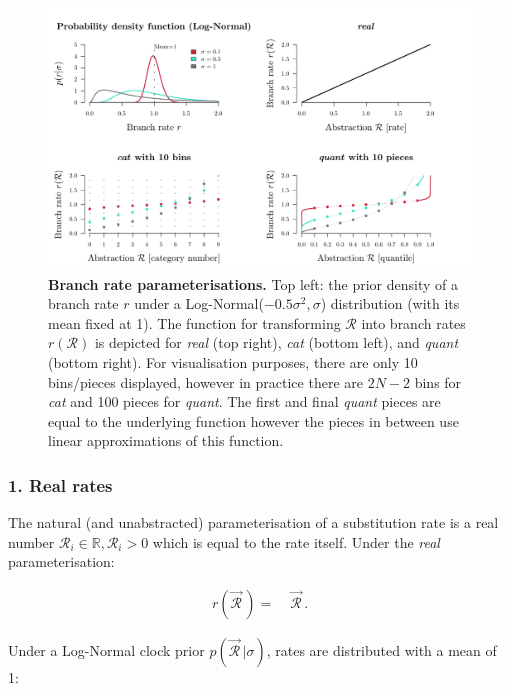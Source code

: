 \documentclass[10pt,letterpaper]{article}
\begin{document}
\begin{figure}[!h]
\includegraphics[width=\textwidth]{Figures/rateparameterisation.pdf}
\caption{\textbf{Branch rate parameterisations.} Top left: the prior density of a branch rate $r$ under a Log-Normal($-0.5\sigma^2, \sigma$) distribution (with its mean fixed at 1). 
The function for transforming $\mathcal{R}$ into branch rates $r(\mathcal{R})$ is depicted for \textit{real} (top right), \textit{cat} (bottom left), and \textit{quant} (bottom right).
For visualisation purposes, there are only 10 bins/pieces displayed, however in practice there are $2N-2$ bins for \textit{cat} and 100 pieces for \textit{quant}.
The first and final \textit{quant} pieces are equal to the underlying function however the pieces in between use linear approximations of this function. }
\label{fig:rateparams}
\end{figure}



\clearpage
\subsubsection*{1. Real rates}
The natural (and unabstracted) parameterisation of a substitution rate is a real number $\mathcal{R}_i \in \mathbb{R}, \mathcal{R}_i > 0$ which is equal to the rate itself. 
Under the \textit{real} parameterisation:

\begin{align}
r(\vec{\mathcal{R}}^{\,}) =& \; \vec{\mathcal{R}}^{\,}.
\end{align}


Under a Log-Normal clock prior $p(\vec{\mathcal{R}}^{\,} | \sigma)$, rates are distributed with a mean of 1:
\end{document}
